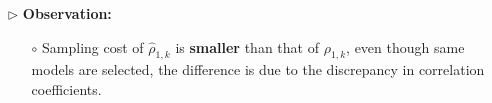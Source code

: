 \documentclass{beamer}
\begin{document}
\begin{frame}[t]
\begin{table}[ht]
\end{table}
%
%
{\footnotesize 
\begin{itemize}[leftmargin=5pt] 
     \item[$\triangleright$] {\bf Observation:} 
     \begin{itemize}[leftmargin=10pt] 
     \item [$\circ$] Sampling cost of $\widehat \rho_{1,k}$ is {\bf smaller} than that of $\rho_{1,k}$, even though same models are selected, the difference is due to the discrepancy in correlation coefficients.
     \end{itemize}
\end{itemize}
 }
\end{frame}





        
        
\end{document}
